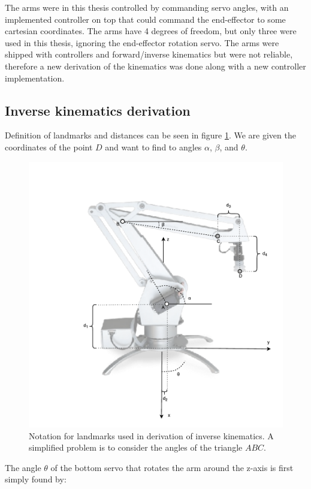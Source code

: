 The arms were in this thesis controlled by commanding servo angles, with an
implemented controller on top that could command the end-effector to some
cartesian coordinates. The arms have 4 degrees of freedom, but only three were
used in this thesis, ignoring the end-effector rotation servo. The arms were
shipped with controllers and forward/inverse kinematics but were not reliable,
therefore a new derivation of the kinematics was done along with a new
controller implementation.

\subsection{Inverse kinematics derivation}

Definition of landmarks and distances can be seen in figure
\ref{fig:uarm_landmarks}. We are given the coordinates of the point $D$ and
want to find to angles $\alpha$, $\beta$, and $\theta$.

\begin{figure}[!ht]
    \centering
    \includegraphics[width=0.80 \textwidth]{res/inverse_kinematics.pdf}

    \caption{Notation for landmarks used in derivation of inverse kinematics. A
    simplified problem is to consider the angles of the triangle $ABC$.}

    \label{fig:uarm_landmarks}

\end{figure}

The angle $\theta$ of the bottom servo that rotates the arm around the z-axis
is first simply found by:

